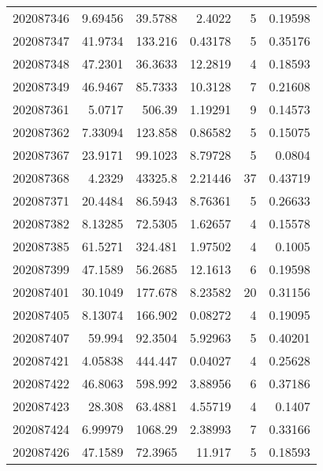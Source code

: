 \begin{tabular}{rrrrrr}
 202087346 &          9.69456 &       39.5788 &            2.4022  &           5 & 0.19598 \\
 202087347 &         41.9734  &      133.216  &            0.43178 &           5 & 0.35176 \\
 202087348 &         47.2301  &       36.3633 &           12.2819  &           4 & 0.18593 \\
 202087349 &         46.9467  &       85.7333 &           10.3128  &           7 & 0.21608 \\
 202087361 &          5.0717  &      506.39   &            1.19291 &           9 & 0.14573 \\
 202087362 &          7.33094 &      123.858  &            0.86582 &           5 & 0.15075 \\
 202087367 &         23.9171  &       99.1023 &            8.79728 &           5 & 0.0804  \\
 202087368 &          4.2329  &    43325.8    &            2.21446 &          37 & 0.43719 \\
 202087371 &         20.4484  &       86.5943 &            8.76361 &           5 & 0.26633 \\
 202087382 &          8.13285 &       72.5305 &            1.62657 &           4 & 0.15578 \\
 202087385 &         61.5271  &      324.481  &            1.97502 &           4 & 0.1005  \\
 202087399 &         47.1589  &       56.2685 &           12.1613  &           6 & 0.19598 \\
 202087401 &         30.1049  &      177.678  &            8.23582 &          20 & 0.31156 \\
 202087405 &          8.13074 &      166.902  &            0.08272 &           4 & 0.19095 \\
 202087407 &         59.994   &       92.3504 &            5.92963 &           5 & 0.40201 \\
 202087421 &          4.05838 &      444.447  &            0.04027 &           4 & 0.25628 \\
 202087422 &         46.8063  &      598.992  &            3.88956 &           6 & 0.37186 \\
 202087423 &         28.308   &       63.4881 &            4.55719 &           4 & 0.1407  \\
 202087424 &          6.99979 &     1068.29   &            2.38993 &           7 & 0.33166 \\
 202087426 &         47.1589  &       72.3965 &           11.917   &           5 & 0.18593 \\

\end{tabular}
